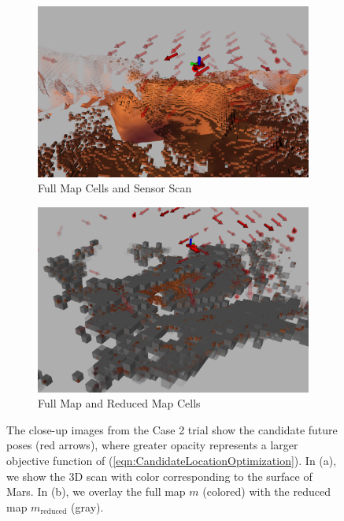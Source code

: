 \documentclass[conf]{new-aiaa}
\newcommand{\refeqn}[1]{(\ref{eqn:#1})}
\begin{document}
\begin{figure}[!t]
	\centering
	\begin{subfigure}[t]{0.95\columnwidth}
           	\centering
          	\includegraphics[width=\textwidth]{mars_closeup.png}
        		\caption{Full Map Cells and Sensor Scan}
		\vspace*{0.025\textwidth}
    	\end{subfigure}
	\centering
	\begin{subfigure}[t]{0.95\columnwidth}
           	\centering
          	\includegraphics[width=\textwidth]{scitech_reducedCells.png}
        		\caption{Full Map and Reduced Map Cells}
		\vspace*{0.025\textwidth}
    	\end{subfigure}
\caption{The close-up images from the Case 2 trial show the candidate future poses (red arrows), where greater opacity represents a larger objective function of \refeqn{CandidateLocationOptimization}. In (a), we show the 3D scan with color corresponding to the surface of Mars. In (b), we overlay the full map $m$ (colored) with the reduced map $m_\text{reduced}$ (gray).}
\label{fig:marsZoomedIn}
\end{figure}
\end{document}
